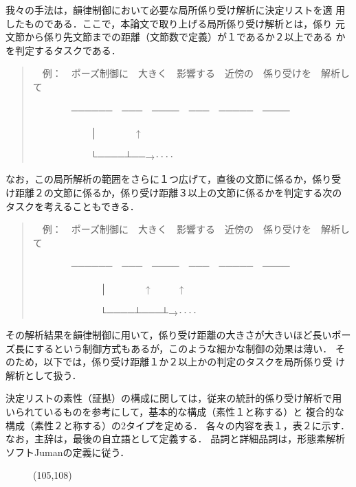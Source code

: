   我々の手法は，韻律制御において必要な局所係り受け解析に決定リストを適
用したものである．ここで，本論文で取り上げる局所係り受け解析とは，係り
元文節から係り先文節までの距離（文節数で定義）が１であるか２以上である
かを判定するタスクである．
\begin{quote}

　例：　ポーズ制御に　大きく　影響する　近傍の　係り受けを　解析して
\vspace{-2mm}

　　　　──────　───　────　───　─────　────
\vspace{-2mm}

　　　　　　│　　　　↑
\vspace{-2mm}

　　　　　　└────┴──→‥‥

\end{quote}
なお，この局所解析の範囲をさらに１つ広げて，直後の文節に係るか，係り受
け距離２の文節に係るか，係り受け距離３以上の文節に係るかを判定する次の
タスクを考えることもできる．
\begin{quote}

　例：　ポーズ制御に　大きく　影響する　近傍の　係り受けを　解析して
\vspace{-2mm}

　　　　──────　───　────　───　─────　────
\vspace{-2mm}

　　　　　　　│　　　　↑　　　↑
\vspace{-2mm}

　　　　　　　└────┴───┴→‥‥

\end{quote}
その解析結果を韻律制御に用いて，係り受け距離の大きさが大きいほど長いポー
ズ長にするという制御方式もあるが，このような細かな制御の効果は薄い．
そのため，以下では，係り受け距離１か２以上かの判定のタスクを局所係り受
け解析として扱う．



決定リストの素性（証拠）の構成に関しては，従来の統計的係り受け解析で用
いられているものを参考にして，基本的な構成（素性１と称する）と
複合的な構成（素性２と称する）の2タイプを定める．
各々の内容を表１，表２に示す．
なお，主辞は，最後の自立語として定義する．
品詞と詳細品詞は，形態素解析ソフトJumanの定義に従う．

\begin{figure}[t]
  \begin{center}
	\atari(105,108)
  \end{center}
\end{figure}


